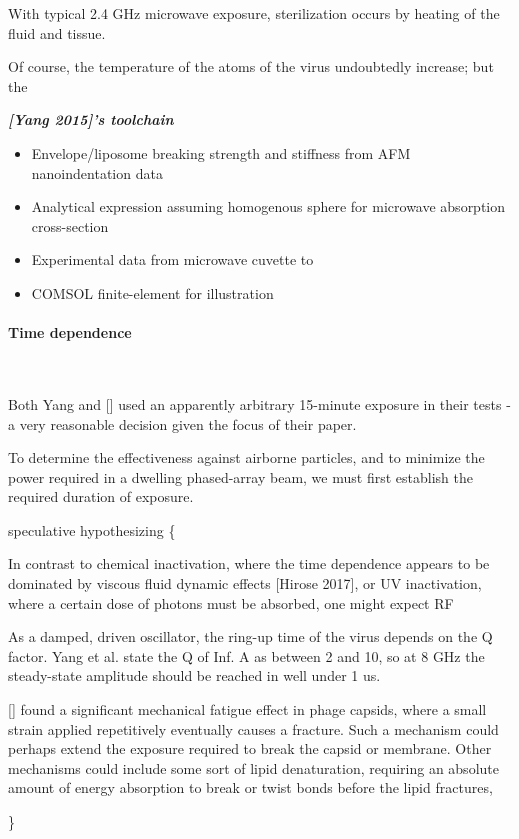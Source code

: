\documentclass[fleqn,10pt]{article}
\begin{document}
\begin{multicols}{1}

With typical 2.4 GHz microwave exposure, sterilization occurs by heating of the fluid and tissue.

Of course, the temperature of the atoms of the virus undoubtedly increase; but the 

\begin{toolchain}
	{\it \bf [Yang 2015]'s toolchain}
	\begin{itemize}
	\item Envelope/liposome breaking strength and stiffness from AFM nanoindentation data
	\item Analytical expression assuming homogenous sphere for microwave absorption cross-section
	\item Experimental data from microwave cuvette to 
	\item COMSOL finite-element for illustration
	\end{itemize}
\end{toolchain}


\paragraph{\textbf{Time dependence}}\


Both Yang and [] used an apparently arbitrary 15-minute exposure in their tests - a very reasonable decision given the focus of their paper. 

To determine the effectiveness against airborne particles, and to minimize the power required in a dwelling phased-array beam, we must first establish the required duration of exposure.

{\color{red} speculative hypothesizing \{ } 

In contrast to chemical inactivation, where the time dependence appears to be dominated by viscous fluid dynamic effects [Hirose 2017], or UV inactivation, where a certain dose of photons must be absorbed, one might expect RF 

As a damped, driven oscillator, the ring-up time of the virus depends on the Q factor. Yang et al. state the Q of Inf. A as between 2 and 10, so at 8 GHz the steady-state amplitude should be reached in well under 1 us. 

[] found a significant mechanical fatigue effect in phage capsids, where a small strain applied repetitively eventually causes a fracture. Such a mechanism could perhaps extend the exposure required to break the capsid or membrane. Other mechanisms could include some sort of lipid denaturation, requiring an absolute amount of energy absorption to break or twist bonds before the lipid fractures,

{\color{red}  \} } 

\end{multicols}
\end{document}
